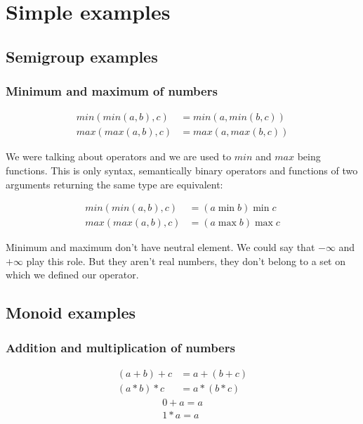 \documentclass{article}
\begin{document}
\section{Simple examples}

    \subsection{Semigroup examples}

    \subsubsection{Minimum and maximum of numbers}

    \begin{align*}
        min(min(a, b), c) &= min(a, min(b, c)) \\
        max(max(a, b), c) &= max(a, max(b, c))
    \end{align*}

    We were talking about operators and we are used to $min$ and $max$ being functions. 
    This is only syntax, semantically binary operators and functions of two arguments returning the same type are equivalent:

    \begin{align*}
        min(min(a, b), c) &= (a \min b) \min c \\ 
        max(max(a, b), c) &= (a \max b) \max c 
    \end{align*}

    Minimum and maximum don't have neutral element. 
    We could say that $-\infty$ and $+\infty$ play this role. 
    But they aren't real numbers, they don't belong to a set on which we defined our operator.

    \subsection{Monoid examples}

    \subsubsection{Addition and multiplication of numbers}

    \begin{align*}
        (a + b) + c &= a + (b + c) \\
        (a * b) * c &= a * (b * c)
    \end{align*}
    \begin{align*}
        0 + a = a \\
        1 * a = a  
    \end{align*}
\end{document}
